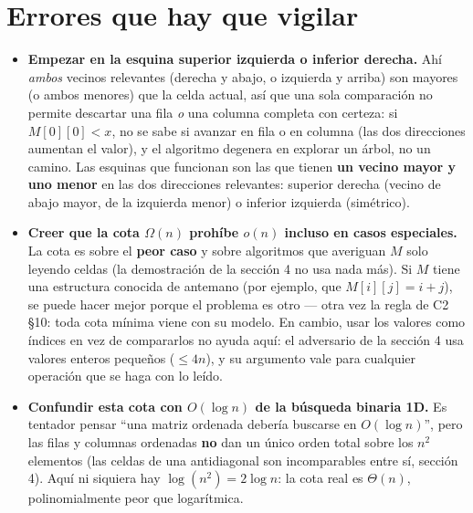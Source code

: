 \documentclass[11pt]{article}
\begin{document}
\section*{Errores que hay que vigilar}

\begin{alerta}{}
\begin{itemize}[leftmargin=14pt]
\item \textbf{Empezar en la esquina superior izquierda o inferior derecha.} Ahí \emph{ambos} vecinos
relevantes (derecha y abajo, o izquierda y arriba) son mayores (o ambos menores) que la celda actual, así
que una sola comparación no permite descartar una fila \emph{o} una columna completa con certeza: si
$M[0][0]<x$, no se sabe si avanzar en fila o en columna (las dos direcciones aumentan el valor), y el
algoritmo degenera en explorar un árbol, no un camino. Las esquinas que funcionan son las que tienen
\textbf{un vecino mayor y uno menor} en las dos direcciones relevantes: superior derecha (vecino de abajo
mayor, de la izquierda menor) o inferior izquierda (simétrico).
\item \textbf{Creer que la cota $\Omega(n)$ prohíbe $o(n)$ incluso en casos especiales.} La cota es sobre el
\textbf{peor caso} y sobre algoritmos que averiguan $M$ solo leyendo celdas (la demostración de la sección 4
no usa nada más). Si $M$ tiene una estructura conocida de antemano (por ejemplo, que $M[i][j]=i+j$), se puede
hacer mejor porque el problema es otro --- otra vez la regla de C2 §10: toda cota mínima viene con su modelo.
En cambio, usar los valores como índices en vez de compararlos no ayuda aquí: el adversario de la sección 4
usa valores enteros pequeños ($\le 4n$), y su argumento vale para cualquier operación que se haga con lo leído.
\item \textbf{Confundir esta cota con $O(\log n)$ de la búsqueda binaria 1D.} Es tentador pensar ``una
matriz ordenada debería buscarse en $O(\log n)$'', pero las filas y columnas ordenadas \textbf{no} dan un
único orden total sobre los $n^2$ elementos (las celdas de una antidiagonal son incomparables entre sí,
sección 4). Aquí ni siquiera hay $\log(n^2)=2\log n$: la cota real
es $\Theta(n)$, polinomialmente peor que logarítmica.
\end{itemize}
\end{alerta}
\end{document}
